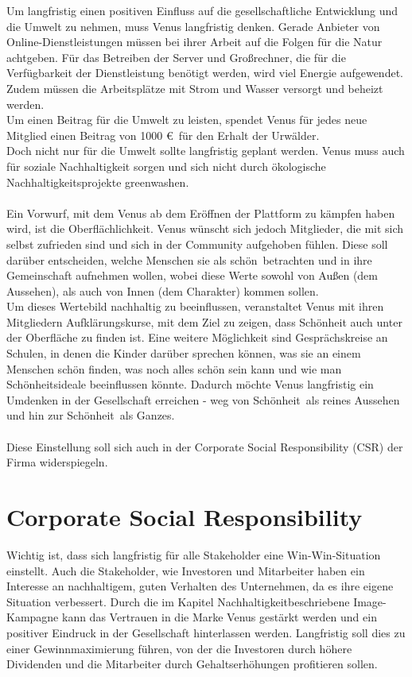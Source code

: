 \documentclass[a4paper, fontsize=12pt, parskip=full, toc=bibliographynumbered]{scrreprt}
\begin{document}
Um langfristig einen positiven Einfluss auf die gesellschaftliche Entwicklung und die Umwelt zu nehmen, muss Venus langfristig denken.
Gerade Anbieter von Online-Dienstleistungen müssen bei ihrer Arbeit auf die Folgen für die Natur achtgeben. Für das Betreiben der Server und
Großrechner, die für die Verfügbarkeit der Dienstleistung benötigt werden, wird viel Energie aufgewendet. Zudem müssen die Arbeitsplätze mit Strom 
und Wasser versorgt und beheizt werden.\\
Um einen Beitrag für die Umwelt zu leisten, spendet Venus für jedes neue Mitglied einen Beitrag von 1000 \euro~für den Erhalt der Urwälder. \\
Doch nicht nur für die Umwelt sollte langfristig geplant werden. Venus muss auch für soziale Nachhaltigkeit sorgen und sich nicht durch ökologische Nachhaltigkeitsprojekte \glqq greenwashen\grqq.\\
\\
Ein Vorwurf, mit dem Venus ab dem Eröffnen der Plattform zu kämpfen haben wird, ist die \glqq Oberflächlichkeit\grqq. Venus wünscht sich jedoch Mitglieder, die mit sich selbst zufrieden sind und sich in der Community aufgehoben fühlen. Diese soll darüber entscheiden, welche Menschen sie als \glqq schön\grqq~betrachten und in ihre Gemeinschaft aufnehmen wollen, wobei diese Werte sowohl von Außen (dem Aussehen), als auch von Innen (dem Charakter) kommen sollen.\\
Um dieses Wertebild nachhaltig zu beeinflussen, veranstaltet Venus mit ihren Mitgliedern Aufklärungskurse, mit dem Ziel zu zeigen, dass Schönheit auch unter der Oberfläche zu finden ist. Eine weitere Möglichkeit sind Gesprächskreise an Schulen, in denen die Kinder darüber sprechen können, was sie an einem Menschen schön finden, was noch alles schön sein kann und wie man Schönheitsideale beeinflussen könnte. Dadurch möchte Venus langfristig ein Umdenken in der Gesellschaft erreichen - weg von \glqq Schönheit\grqq~als reines Aussehen und hin zur \glqq Schönheit\grqq~als Ganzes.\\
\\
Diese Einstellung soll sich auch in der Corporate Social Responsibility (CSR) der Firma widerspiegeln.

\section{Corporate Social Responsibility}

Wichtig ist, dass sich langfristig für alle Stakeholder eine Win-Win-Situation einstellt. Auch die Stakeholder, wie Investoren und Mitarbeiter haben ein Interesse an nachhaltigem, guten Verhalten des Unternehmen, da es ihre eigene Situation verbessert. Durch die im Kapitel \glqq Nachhaltigkeit\grqq beschriebene Image-Kampagne kann das
Vertrauen in die Marke Venus gestärkt werden und ein positiver Eindruck in der Gesellschaft hinterlassen werden. Langfristig soll dies zu einer Gewinnmaximierung führen, von der die Investoren durch höhere Dividenden und die Mitarbeiter durch Gehaltserhöhungen profitieren sollen.
\end{document}
